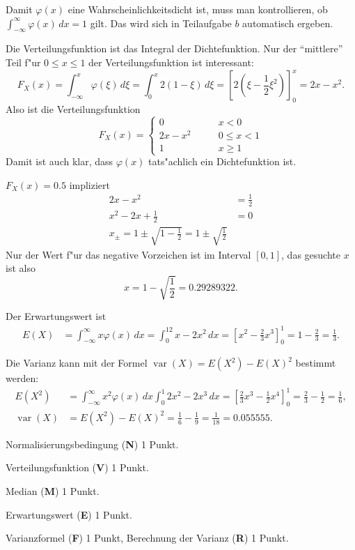 \begin{loesung}
\begin{teilaufgaben}
\item Damit $\varphi(x)$ eine Wahrscheinlichkeitsdicht ist, muss man 
kontrollieren, ob $\int_{-\infty}^\infty\varphi(x)\,dx=1$ gilt. Das
wird sich in Teilaufgabe $b$ automatisch ergeben.
\item Die Verteilungsfunktion ist das Integral der Dichtefunktion.
Nur der ``mittlere'' Teil f"ur $0\le x\le 1$
der Verteilungsfunktion ist interessant:
\[
F_X(x)=\int_{-\infty}^x\varphi(\xi)\,d\xi =\int_0^x2(1-\xi)\,d\xi=
\left[2(\xi-\frac12\xi^2)\right]_0^x=2x-x^2.
\]
Also ist die Verteilungsfunktion
\[
F_X(x)=\begin{cases}
     0&\qquad x < 0\\
2x-x^2&\qquad 0\le x < 1\\
     1&\qquad x \ge 1
\end{cases}
\]
Damit ist auch klar, dass $\varphi(x)$ tats"achlich ein Dichtefunktion ist.
\item $F_X(x)=0.5$ impliziert
\begin{align*}
2x-x^2&=\frac12\\
x^2-2x+\frac12&=0\\
x_\pm=1\pm\sqrt{1-\frac12}=1\pm\sqrt{\frac12}
\end{align*}
Nur der Wert f"ur das negative Vorzeichen ist im Interval $[0,1]$, das gesuchte
$x$ ist also
\[
x=1-\sqrt{\frac12}=0.29289322.
\]
\item
Der Erwartungswert ist
\begin{align*}
E(X)&=\int_{-\infty}^{\infty}x\varphi(x)\,dx
=\int_0^12x-2x^2\,dx=\left[ x^2-\frac23x^3\right]_0^1=1-\frac23=\frac13.
\end{align*}
\item Die Varianz kann mit der Formel
$\operatorname{var}(X)=E(X^2)-E(X)^2$ bestimmt werden:
\begin{align*}
E(X^2)&=\int_{-\infty}^{\infty}x^2\varphi(x)\,dx
\int_0^1 2x^2-2x^3\,dx
=\left[\frac23x^3-\frac12x^4\right]_0^1
=\frac23-\frac12=\frac16,
\\
\operatorname{var}(X)&=E(X^2)-E(X)^2=\frac16 - \frac19=\frac1{18}=0.055555.
\end{align*}
\end{teilaufgaben}
\end{loesung}

\begin{bewertung}
\begin{teilaufgaben}
\item Normalisierungsbedingung ({\bf N}) 1 Punkt.
\item Verteilungsfunktion ({\bf V}) 1 Punkt.
\item Median ({\bf M}) 1 Punkt.
\item Erwartungswert ({\bf E}) 1 Punkt.
\item Varianzformel ({\bf F}) 1 Punkt, Berechnung der Varianz ({\bf R}) 1 Punkt.
\end{teilaufgaben}
\end{bewertung}

